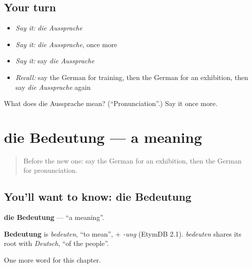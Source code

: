 \subsection*{Your turn}
\begin{itemize}
\raggedright
  \item \emph{Say it:} \emph{die Aussprache}
  \item \emph{Say it:} \emph{die Aussprache}, once more
  \item \emph{Say it:} say \emph{die Aussprache}
  \item \emph{Recall:} say the German for training, then the German for an exhibition, then say \emph{die Aussprache} again
\end{itemize}

\begin{tcolorbox}[breakable,colback=teal!4,colframe=teal!35!black,title={Before you move on}]
What does die Aussprache mean? (\textquotedblleft{}Pronunciation\textquotedblright{}.) Say it once more.
\end{tcolorbox}
\section[die Bedeutung]{die Bedeutung — a meaning}

\label{lesson:GE-C226-bedeutung}



\begin{quote}
Before the new one: say the German for an exhibition, then the German for pronunciation.
\end{quote}

\subsection*{You'll want to know: die Bedeutung}
\textbf{die Bedeutung} — \textquotedblleft{}a meaning\textquotedblright{}.

\begin{cousinweb}
\textbf{Bedeutung} is \emph{bedeuten}, \textquotedblleft{}to mean\textquotedblright{}, + \emph{-ung} (EtymDB 2.1). \emph{bedeuten} shares its root with \emph{Deutsch}, \textquotedblleft{}of the people\textquotedblright{}.
\end{cousinweb}

\begin{grammarlens}[title={What you've built}]
One more word for this chapter.
\end{grammarlens}

